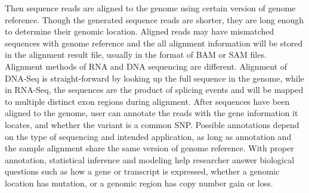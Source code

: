 Then sequence reads are aligned to the genome using certain version of genome
reference. Though the generated sequence reads are shorter, they are long
enough to determine their genomic location. Aligned reads may have mismatched
sequences with genome reference and the all alignment information will be
stored in the alignment result file, usually in the format of BAM or SAM files.
Alignment methods of RNA and DNA sequencing are different. Alignment of DNA-Seq
is straight-forward by looking up the full sequence in the genome, while in
RNA-Seq, the sequences are the product of splicing events and will be mapped to
multiple distinct exon regions during alignment. After sequences have been
aligned to the genome, user can annotate the reads with the gene information it
locates, and whether the variant is a common SNP. Possible annotations depend
on the type of sequencing and intended application, as long as annotation and
the sample alignment share the same version of genome reference. With proper
annotation, statistical inference and modeling help researcher answer
biological questions such as how a gene or transcript is expressed, whether a
genomic location has mutation, or a genomic region has copy number gain or
loss.


%


